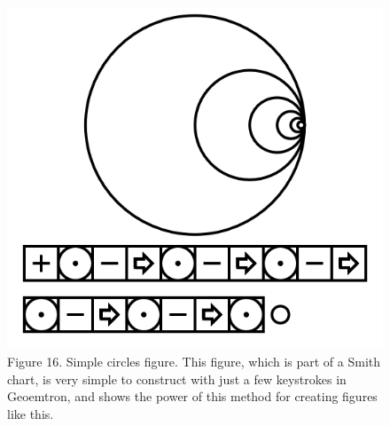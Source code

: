 \documentclass[11pt]{article}
\begin{document}
\begin{figure}

\includegraphics[width=\linewidth]{figures/figure16_circlesFractal.png}

\caption{Figure 16. Simple circles figure.  This figure, which is part of a Smith chart, is very simple to construct with just a few keystrokes in Geoemtron, and shows the power of this method for creating figures like this. }
\end{figure}
\end{document}
